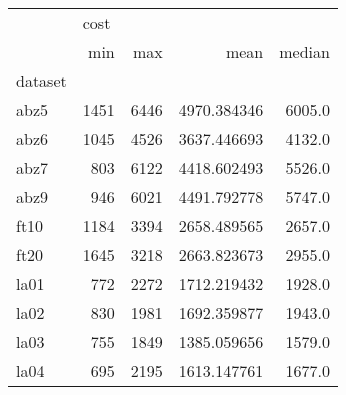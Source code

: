 \begin{tabular}{lrrrr}
\toprule
{} & \multicolumn{4}{l}{cost} \\
{} &   min &   max &         mean &  median \\
dataset &       &       &              &         \\
\midrule
abz5    &  1451 &  6446 &  4970.384346 &  6005.0 \\
abz6    &  1045 &  4526 &  3637.446693 &  4132.0 \\
abz7    &   803 &  6122 &  4418.602493 &  5526.0 \\
abz9    &   946 &  6021 &  4491.792778 &  5747.0 \\
ft10    &  1184 &  3394 &  2658.489565 &  2657.0 \\
ft20    &  1645 &  3218 &  2663.823673 &  2955.0 \\
la01    &   772 &  2272 &  1712.219432 &  1928.0 \\
la02    &   830 &  1981 &  1692.359877 &  1943.0 \\
la03    &   755 &  1849 &  1385.059656 &  1579.0 \\
la04    &   695 &  2195 &  1613.147761 &  1677.0 \\
\bottomrule
\end{tabular}
